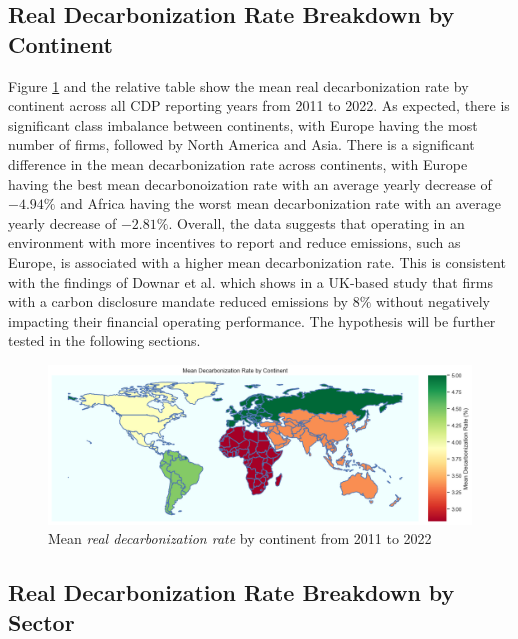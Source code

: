 \subsection{Real Decarbonization Rate Breakdown by Continent}
Figure \ref{fig:emission-breakdown-by-continent} and the relative table show the mean real decarbonization rate by continent across all CDP reporting years from 2011 to 2022. As expected, there is significant class imbalance between continents, with Europe having the most number of firms, followed by North America and Asia. There is a significant difference in the mean decarbonization rate across continents, with Europe having the best mean decarbonoization rate with an average yearly decrease of $-4.94 \%$ and Africa having the worst mean decarbonization rate with an average yearly decrease of $-2.81 \%$. Overall, the data suggests that operating in an environment with more incentives to report and reduce emissions, such as Europe, is associated with a higher mean decarbonization rate. This is consistent with the findings of Downar et al.  \cite{Downar2020The} which shows in a UK-based study that firms with a carbon disclosure mandate reduced emissions by $8\%$ without negatively impacting their financial operating performance. The hypothesis will be further tested in the following sections.
\noindent 

\begin{figure}[H]
    \begin{center}
    \includegraphics[width=5in]{figures/mean_decarbonization_rate_by_continent.png}
    \caption{Mean \textit{real decarbonization rate} by continent from 2011 to 2022}
    \label{fig:emission-breakdown-by-continent}
    \end{center}
\end{figure}
  




\subsection{Real Decarbonization Rate Breakdown by Sector}


